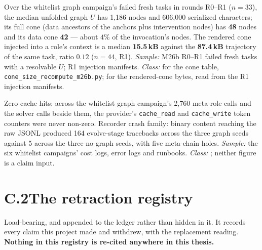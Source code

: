 \begin{description}[leftmargin=0pt,style=nextline,font=\normalfont,itemsep=6pt]
\item[\textbf{F55}\quad Cone size, and the rendered cone against the
      trajectory it competes with.]
Over the whitelist graph campaign's failed fresh tasks in rounds R0--R1
($n{=}33$), the median unfolded graph $U$ has 1{,}186 nodes and
606{,}000 serialized characters; its full cone (data ancestors of the
anchors plus intervention nodes) has \textbf{48} nodes and its data
cone \textbf{42} --- about $4\%$ of the invocation's nodes. The rendered
cone injected into a role's context is a median \textbf{15.5\,kB}
against the \textbf{87.4\,kB} trajectory of the same task, ratio
$0.12$ ($n{=}44$, R1). \emph{Sample:} M26b R0--R1 failed fresh tasks
with a resolvable $U$; R1 injection manifests. \emph{Class:} 
for the cone table, \texttt{cone\_size\_recompute\_m26b.py}; 
for the rendered-cone bytes, read from the R1 injection manifests.

\item[\textbf{F56}\quad Operations record: cache counters and the
      recorder's crash family.] 
Zero cache hits: across the whitelist graph campaign's 2{,}760 meta-role
calls and the solver calls beside them, the provider's
\texttt{cache\_read} and \texttt{cache\_write} token counters were never
non-zero. Recorder crash family: binary content reaching the raw JSONL
produced 164 evolve-stage tracebacks across the three graph seeds
against 5 across the three no-graph seeds, with five meta-chain holes.
\emph{Sample:} the six whitelist campaigns' cost logs, error logs and
runbooks. \emph{Class:} ; neither figure is a claim input.

\end{description}

\section*{C.2\quad The retraction registry}

Load-bearing, and appended to the ledger rather than hidden in it. It
records every claim this project made and withdrew, with the replacement
reading. \textbf{Nothing in this registry is re-cited anywhere in this
thesis.}

